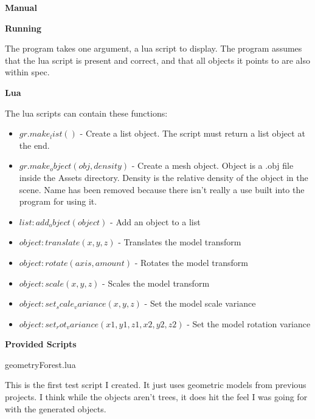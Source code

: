 \documentclass[10pt]{article}
\begin{document}
	
	\begin{center}
		\large\bf Manual
	\end{center}
	
	\begin{center}
		\bf Running
	\end{center}
	
	The program takes one argument, a lua script to display. The program assumes that the lua script is present and correct, and that all objects it points to are also within spec.
	
	\begin{center}
		\bf Lua
	\end{center}
	The lua scripts can contain these functions:
	\begin{itemize}
		\item $gr.make_list()$ - Create a list object. The script must return a list object at the end.
		\item $gr.make_object(obj, density)$ - Create a mesh object. Object is a .obj file inside the Assets directory. Density is the relative density of the object in the scene. Name has been removed because there isn't really a use built into the program for using it.
		
		\item $list:add_object(object)$ - Add an object to a list
		
		\item $object:translate(x, y, z)$ - Translates the model transform
		\item $object:rotate(axis, amount)$ - Rotates the model transform
		\item $object:scale(x, y, z)$ - Scales the model transform
		
		\item $object:set_scale_variance(x, y, z)$ - Set the model scale variance
		\item $object:set_rot_variance(x1, y1, z1, x2, y2, z2)$ - Set the model rotation variance
	\end{itemize}
	
	\begin{center}
		\bf Provided Scripts
	\end{center}
	
	\begin{center}
		geometryForest.lua
	\end{center}
	
	This is the first test script I created. It just uses geometric models from previous projects. I think while the objects aren't trees, it does hit the feel I was going for with the generated objects.
	
\end{document}
